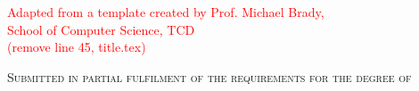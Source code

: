 \begin{titlepage}
\textcolor{red}{Adapted from a template created by Prof. Michael Brady, \\ School of Computer Science, TCD \\(remove line 45, title.tex)}


\vfill

\textsc{\normalsize Submitted in partial fulfilment of the requirements for the degree of \\
\degree}

\vfill %

\end{titlepage}